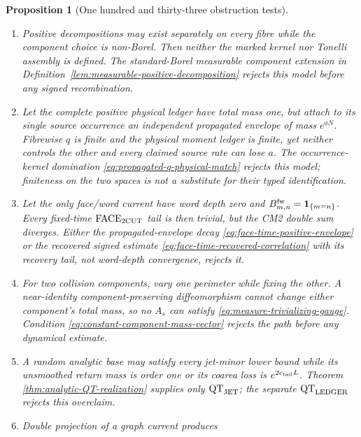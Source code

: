 \documentclass[11pt]{article}
\newtheorem{proposition}[theorem]{Proposition}
\newcommand{\one}{\mathbf 1}
\begin{document}
\begin{proposition}[One hundred and thirty-three obstruction tests]
\begin{enumerate}[label=\textup{(T\arabic*)}]
      on the resonant set even though the $a$-free reference slope has small
      energy.  Pointwise normalization of $\zeta$ alone then preserves the
      wrong event.  The event compatibility in
      \eqref{eq:joint-source-energy-transfer}, or the transported inclusion
      \eqref{eq:carrier-match-slope-window}, rejects it.
\item Positive decompositions may exist separately on every fibre while the
      component choice is non-Borel.  Then neither the marked kernel nor
      Tonelli assembly is defined.  The standard-Borel measurable component
      extension in Definition~\ref{lem:measurable-positive-decomposition} rejects
      this model before any signed recombination.
\item Let the complete positive physical ledger have total mass one, but
      attach to its single source occurrence an independent propagated
      envelope of mass $e^{aN}$.  Fibrewise $q$ is finite and the physical
      moment ledger is finite, yet neither controls the other and every
      claimed source rate can lose $a$.  The occurrence-kernel domination
      \eqref{eq:propagated-q-physical-match} rejects this model; finiteness on
      the two spaces is not a substitute for their typed identification.
\item Let the only face/word current have word depth zero and
      $B_{m,n}^{\rm fw}=\one_{\{m=n\}}$.  Every fixed-time
      $\mathrm{FACE}_{\rm 2CUT}$ tail is then trivial, but the CM2 double sum
      diverges.  Either the propagated-envelope decay
      \eqref{eq:face-time-positive-envelope} or the recovered signed estimate
      \eqref{eq:face-time-recovered-correlation} with its recovery tail,
      not word-depth convergence, rejects it.
\item For two collision components, vary one perimeter while fixing the
      other.  A near-identity component-preserving diffeomorphism cannot
      change either component's total mass, so no $A_s$ can satisfy
      \eqref{eq:measure-trivializing-gauge}.  Condition
      \eqref{eq:constant-component-mass-vector} rejects the path before any
      dynamical estimate.
\item A random analytic base may satisfy every jet-minor lower bound while
      its unsmoothed return mass is order one or its coarea loss is
      $e^{2c_{\rm tail}L}$.  Theorem
      \ref{thm:analytic-QT-realization} supplies only
      $\mathrm{QT}_{\rm JET}$; the separate
      $\mathrm{QT}_{\rm LEDGER}$ rejects this overclaim.
\item Double projection of a graph current produces

\end{enumerate}
\end{proposition}
\end{document}
